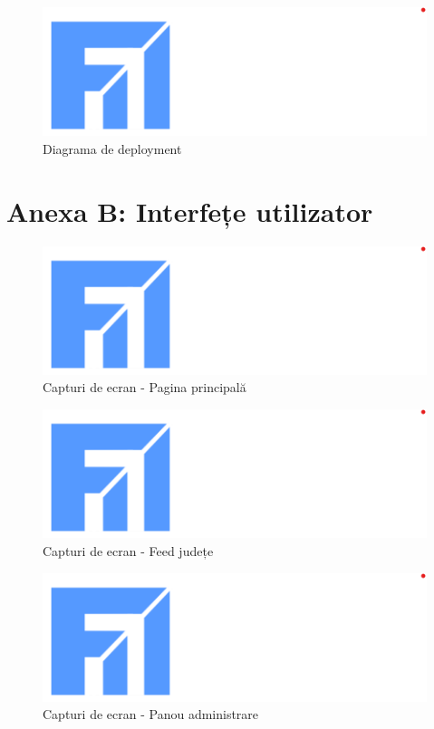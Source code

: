 \documentclass[12pt,a4paper]{report}
\begin{document}
\begin{figure}[H]
\centering
\includegraphics[width=1.0\textwidth]{logo_uaic.png}
\caption{Diagrama de deployment}
\label{fig:deployment_diagram}
\end{figure}

\section*{Anexa B: Interfețe utilizator}

\begin{figure}[H]
\centering
\includegraphics[width=1.0\textwidth]{logo_uaic.png}
\caption{Capturi de ecran - Pagina principală}
\label{fig:homepage_screenshot}
\end{figure}

\begin{figure}[H]
\centering
\includegraphics[width=1.0\textwidth]{logo_uaic.png}
\caption{Capturi de ecran - Feed județe}
\label{fig:feed_screenshot}
\end{figure}

\begin{figure}[H]
\centering
\includegraphics[width=1.0\textwidth]{logo_uaic.png}
\caption{Capturi de ecran - Panou administrare}
\label{fig:admin_screenshot}
\end{figure}
\end{document}
